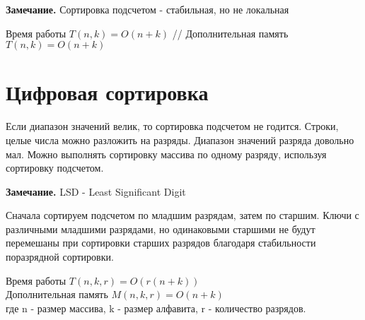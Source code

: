 

\textbf{Замечание.} Сортировка подсчетом - стабильная, но не локальная

Время работы $T(n,k) = O(n+k)$
//
Дополнительная память $T(n,k) = O(n+k)$

\setcounter{section}{20}
\section{Цифровая сортировка}

Если диапазон значений велик, то сортировка подсчетом не годится.
Строки, целые числа можно разложить на разряды. Диапазон значений разряда довольно мал. Можно выполнять сортировку массива по одному разряду, используя сортировку подсчетом.


\textbf{Замечание.} LSD - Least Significant Digit

Сначала сортируем подсчетом по младшим разрядам, затем по старшим. Ключи с различными младшими разрядами, но одинаковыми старшими не будут перемешаны при сортировки старших разрядов благодаря
стабильности поразрядной сортировки.



Время работы $T(n,k,r) = O(r(n+k))$
\\
Дополнительная память  $M(n,k,r) = O(n+k)$
\\
где n - размер массива, k - размер алфавита, r - количество разрядов.